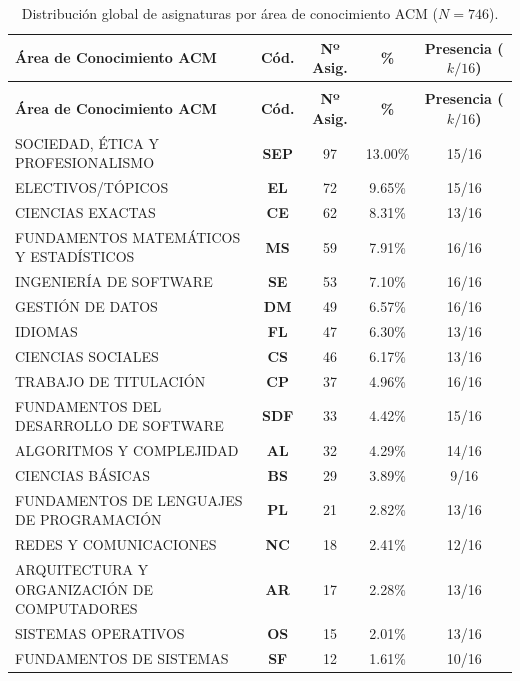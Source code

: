 \documentclass[11pt,a4paper]{article}
\begin{document}
\begin{small}
\begin{longtable}{>{\raggedright\arraybackslash}p{6.8cm} c c c c}
\caption{Distribución global de asignaturas por área de conocimiento ACM ($N=746$).} \label{tab:distribucion_acm} \\
\toprule
\textbf{Área de Conocimiento ACM} & \textbf{Cód.} & \textbf{Nº Asig.} & \textbf{\%} & \textbf{Presencia ($k/16$)} \\
\midrule
\endfirsthead
\multicolumn{5}{l}{\small\textit{Continuación: Distribución global de áreas ACM}} \\[3pt]
\toprule
\textbf{Área de Conocimiento ACM} & \textbf{Cód.} & \textbf{Nº Asig.} & \textbf{\%} & \textbf{Presencia ($k/16$)} \\
\midrule
\endhead
\bottomrule
\endfoot
SOCIEDAD, ÉTICA Y PROFESIONALISMO & \textbf{SEP} & 97 & 13.00\% & 15/16 \\
ELECTIVOS/TÓPICOS & \textbf{EL} & 72 & 9.65\% & 15/16 \\
CIENCIAS EXACTAS & \textbf{CE} & 62 & 8.31\% & 13/16 \\
FUNDAMENTOS MATEMÁTICOS Y ESTADÍSTICOS & \textbf{MS} & 59 & 7.91\% & 16/16 \\
INGENIERÍA DE SOFTWARE & \textbf{SE} & 53 & 7.10\% & 16/16 \\
GESTIÓN DE DATOS & \textbf{DM} & 49 & 6.57\% & 16/16 \\
IDIOMAS & \textbf{FL} & 47 & 6.30\% & 13/16 \\
CIENCIAS SOCIALES & \textbf{CS} & 46 & 6.17\% & 13/16 \\
TRABAJO DE TITULACIÓN & \textbf{CP} & 37 & 4.96\% & 16/16 \\
FUNDAMENTOS DEL DESARROLLO DE SOFTWARE & \textbf{SDF} & 33 & 4.42\% & 15/16 \\
ALGORITMOS Y COMPLEJIDAD & \textbf{AL} & 32 & 4.29\% & 14/16 \\
CIENCIAS BÁSICAS & \textbf{BS} & 29 & 3.89\% & 9/16 \\
FUNDAMENTOS DE LENGUAJES DE PROGRAMACIÓN & \textbf{PL} & 21 & 2.82\% & 13/16 \\
REDES Y COMUNICACIONES & \textbf{NC} & 18 & 2.41\% & 12/16 \\
ARQUITECTURA Y ORGANIZACIÓN DE COMPUTADORES & \textbf{AR} & 17 & 2.28\% & 13/16 \\
SISTEMAS OPERATIVOS & \textbf{OS} & 15 & 2.01\% & 13/16 \\
FUNDAMENTOS DE SISTEMAS & \textbf{SF} & 12 & 1.61\% & 10/16 \\

\end{longtable}
\end{small}
\end{document}
